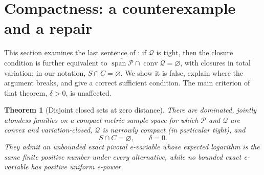 \documentclass[11pt,a4paper]{article}
\newtheorem{theorem}{Theorem}[section]
\theoremstyle{definition}
\theoremstyle{remark}
\newcommand{\PP}{\mathcal P}
\newcommand{\QQ}{\mathcal Q}
\newcommand{\conv}{\operatorname{conv}}
\newcommand{\spn}{\operatorname{span}}
\begin{document}
\section{Compactness: a counterexample and a repair}\label{sec:compact}

This section examines the last sentence of \cite[Theorem~6.8]{ZRW}: if \(\QQ\) is tight, then the closure condition is further equivalent to \(\overline{\spn\PP}\cap\overline{\conv\QQ}=\varnothing\), with closures in total variation; in our notation, \(S\cap C=\varnothing\). We show it is false, explain where the argument breaks, and give a correct sufficient condition. The main criterion of that theorem, \(\delta>0\), is unaffected.

\begin{theorem}[Disjoint closed sets at zero distance]\label{thm:compactcounter}
There are dominated, jointly atomless families on a compact metric sample space for which \(\PP\) and \(\QQ\) are convex and variation-closed, \(\QQ\) is narrowly compact (in particular tight), and
\[
 S\cap C=\varnothing,\qquad \delta=0 .
\]
They admit an unbounded exact pivotal e-variable whose expected logarithm is the same finite positive number under every alternative, while no bounded exact e-variable has positive uniform e-power.
\end{theorem}
\end{document}
